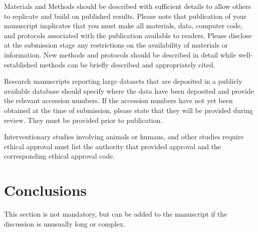 \documentclass[robotics,article,submit,moreauthors,pdftex]{Definitions/mdpi}
\begin{document}
Materials and Methods should be described with sufficient details to allow others to replicate and build on published results. Please note that publication of your manuscript implicates that you must make all materials, data, computer code, and protocols associated with the publication available to readers. Please disclose at the submission stage any restrictions on the availability of materials or information. New methods and protocols should be described in detail while well-established methods can be briefly described and appropriately cited.

Research manuscripts reporting large datasets that are deposited in a publicly available database should specify where the data have been deposited and provide the relevant accession numbers. If the accession numbers have not yet been obtained at the time of submission, please state that they will be provided during review. They must be provided prior to publication.

Interventionary studies involving animals or humans, and other studies require ethical approval must list the authority that provided approval and the corresponding ethical approval code. 

\section{Conclusions}

This section is not mandatory, but can be added to the manuscript if the discussion is unusually long or complex.


\vspace{6pt} 



\end{document}
